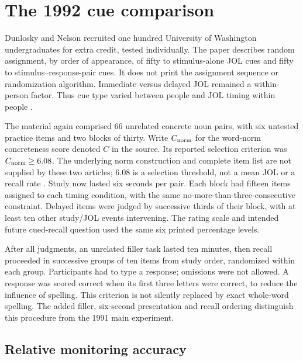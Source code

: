 \section{The 1992 cue comparison}
\label{sec:p19-jol-1992-design}

Dunlosky and Nelson recruited one hundred University of Washington
undergraduates for extra credit, tested individually.
The paper describes random assignment, by order of appearance,
of fifty to stimulus-alone JOL cues and fifty to
stimulus--response-pair cues. It does not print the assignment
sequence or randomization algorithm.
Immediate versus delayed JOL remained a within-person factor.
Thus cue type varied between people and JOL timing within people
\cite[p.~375]{DunloskyNelson1992CueJOL}.

The material again comprised 66 unrelated concrete noun pairs,
with six untested practice items and two blocks of thirty.
Write \(C_{\rm norm}\) for the word-norm concreteness score
denoted \(C\) in the source. Its reported selection criterion
was \(C_{\rm norm}\geq6.08\). The underlying norm construction
and complete item list are not supplied by these two articles;
6.08 is a selection threshold, not a mean JOL or a recall rate
\cite[p.~375]{DunloskyNelson1992CueJOL}.
Study now lasted six seconds per pair. Each block had fifteen
items assigned to each timing condition, with the same
no-more-than-three-consecutive constraint. Delayed items were
judged by successive thirds of their block, with at least ten
other study/JOL events intervening. The rating scale and intended
future cued-recall question used the same six printed percentage levels.

After all judgments, an unrelated filler task lasted ten minutes,
then recall proceeded in successive groups of ten items from
study order, randomized within each group. Participants had to
type a response; omissions were not allowed. A response was
scored correct when its first three letters were correct, to
reduce the influence of spelling. This criterion is not silently
replaced by exact whole-word spelling. The added filler, six-second
presentation and recall ordering distinguish this procedure from
the 1991 main experiment.

\subsection{Relative monitoring accuracy}

